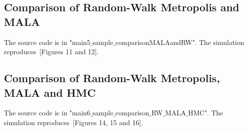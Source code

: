 \documentclass{scrartcl}
\begin{document}
\subsection{Comparison of Random-Walk Metropolis and MALA}

The source code is in "main5$\_$sample$\_$comparisonMALAandRW". The simulation reproduces~\cite{sanz2014markov}[Figures 11 and 12]. 

\subsection{Comparison of Random-Walk Metropolis, MALA and HMC}

The source code is in "main6$\_$sample$\_$comparison$\_$RW$\_$MALA$\_$HMC". The simulation reproduces~\cite{sanz2014markov}[Figures 14, 15 and 16]. 

\newpage






	
    
\end{document}
